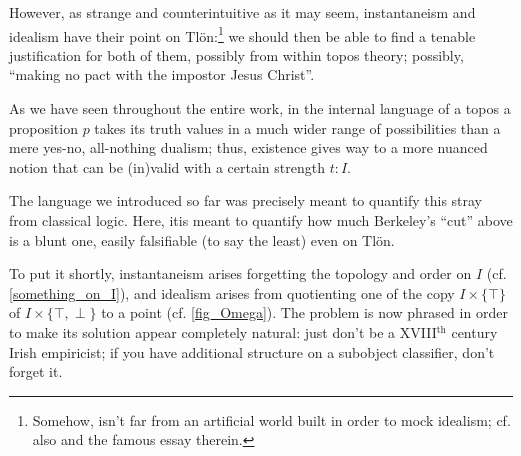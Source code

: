 However, as strange and counterintuitive as it may seem, instantaneism and idealism have their point on Tl\"on:\footnote{Somehow, \cite{tlonEN} isn't far from an artificial world built in order to mock idealism; cf. also \cite{borges1997otras} and the famous essay \cite{confutacion} therein.} we should then be able to find a tenable justification for both of them, possibly from within topos theory; possibly, ``making no pact with the impostor Jesus Christ''.

As we have seen throughout the entire work, in the internal language of a topos a proposition $p$ takes its truth values in a much wider range of possibilities than a mere yes-no, all-nothing dualism; thus, existence gives way to a more nuanced notion that can be (in)valid with a certain strength $t : I$.

The language we introduced so far was precisely meant to quantify this stray from classical logic. Here, itis meant to quantify how much Berkeley's ``cut'' above is a blunt one, easily falsifiable (to say the least) even on Tl\"on.

To put it shortly, instantaneism arises forgetting the topology and order on $I$ (cf. \autoref{something_on_I}), and idealism arises from quotienting one of the copy $I\times \{\top\}$ of $I\times \{\top,\perp\}$ to a point (cf. \autoref{fig_Omega}). The problem is now phrased in order to make its solution appear completely natural: just don't be a XVIII$^\text{th}$ century Irish empiricist; if you have additional structure on a subobject classifier, don't forget it.

